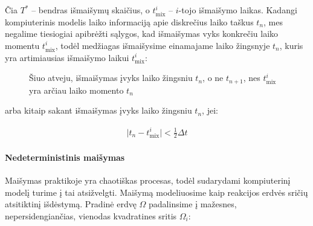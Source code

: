Čia $T^*$ -- bendras išmaišymų skaičius, o $t^i_\text{mix}$ -- $i$-tojo išmaišymo laikas. Kadangi kompiuterinis modelis laiko informaciją apie diskrečius laiko taškus $t_n$, mes negalime tiesiogiai apibrėžti sąlygos, kad išmaišymas vyks konkrečiu laiko momentu $t^i_\text{mix}$, todėl medžiagas išmaišysime einamajame laiko žingsnyje $t_n$, kuris yra artimiausias išmaišymo laikui $t^i_\text{mix}$:

\begin{figure}[!h]
\centering
\caption{Šiuo atveju, išmaišymas įvyks laiko žingsniu $t_n$, o ne $t_{n+1}$, nes $t^i_\text{mix}$ yra arčiau laiko momento $t_n$}
\label{mix-inequality-graphic}
\end{figure}

arba kitaip sakant išmaišymas įvyks laiko žingsniu $t_n$, jei:

\begin{align}
    \vert t_n - t^i_\text{mix} \vert < \frac{1}{2}\Delta t \label{mix-inequality}
\end{align}

\paragraph{Nedeterministinis maišymas}

Maišymas praktikoje yra chaotiškas procesas, todėl sudarydami kompiuterinį modelį turime į tai atsižvelgti. Maišymą modeliuosime kaip reakcijos erdvės sričių atsitiktinį išdėstymą. Pradinė erdvę $\Omega$ padalinsime į mažesnes, nepersidengiančias, vienodas kvadratines sritis $\Omega_i$:

